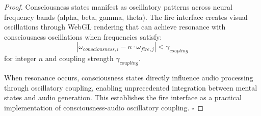 \documentclass[12pt,a4paper]{article}
\begin{document}
\begin{proof}
Consciousness states manifest as oscillatory patterns across neural frequency bands (alpha, beta, gamma, theta). The fire interface creates visual oscillations through WebGL rendering that can achieve resonance with consciousness oscillations when frequencies satisfy:
\begin{equation}
|\omega_{consciousness,i} - n \cdot \omega_{fire,j}| < \gamma_{coupling}
\end{equation}
for integer $n$ and coupling strength $\gamma_{coupling}$.

When resonance occurs, consciousness states directly influence audio processing through oscillatory coupling, enabling unprecedented integration between mental states and audio generation. This establishes the fire interface as a practical implementation of consciousness-audio oscillatory coupling. $\square$
\end{proof}
\end{document}
